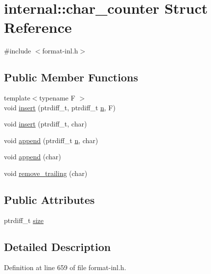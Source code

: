 \hypertarget{structinternal_1_1char__counter}{}\section{internal\+:\+:char\+\_\+counter Struct Reference}
\label{structinternal_1_1char__counter}


{\ttfamily \#include $<$format-\/inl.\+h$>$}

\subsection*{Public Member Functions}
\begin{DoxyCompactItemize}
\item 
{\footnotesize template$<$typename F $>$ }\\void \hyperlink{structinternal_1_1char__counter_ae55f96379ba530c27d33bbd2d7619b6e}{insert} (ptrdiff\+\_\+t, ptrdiff\+\_\+t \hyperlink{format_8h_a9ab7e5832cef391eb8b1505a601fb215}{n}, F)
\item 
void \hyperlink{structinternal_1_1char__counter_aa18c987a332b69675c1f3f1b40b2fd22}{insert} (ptrdiff\+\_\+t, char)
\item 
void \hyperlink{structinternal_1_1char__counter_ad9d13c197b53eb12bf1b14e5cddf6da5}{append} (ptrdiff\+\_\+t \hyperlink{format_8h_a9ab7e5832cef391eb8b1505a601fb215}{n}, char)
\item 
void \hyperlink{structinternal_1_1char__counter_a9dff64172fb761cd81d24ce7482a5eef}{append} (char)
\item 
void \hyperlink{structinternal_1_1char__counter_a483041fe499e14818b5f4e5062af0dce}{remove\+\_\+trailing} (char)
\end{DoxyCompactItemize}
\subsection*{Public Attributes}
\begin{DoxyCompactItemize}
\item 
ptrdiff\+\_\+t \hyperlink{structinternal_1_1char__counter_ab9382f9bce17c0a397605b9c149d702e}{size}
\end{DoxyCompactItemize}


\subsection{Detailed Description}


Definition at line 659 of file format-\/inl.\+h.



